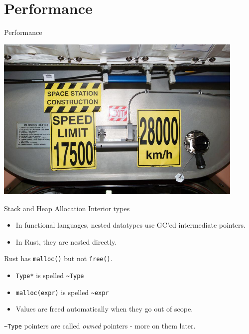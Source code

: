 \documentclass[xcolor=dvipsnames]{beamer}
\begin{document}
\section{Performance}

\begin{frame}{Performance}
	\begin{center}
	\includegraphics[width=0.9\textwidth]{speed.jpg}
	\end{center}
\end{frame}

\begin{frame}{Stack and Heap Allocation}
	Interior types
	\begin{itemize}
		\item In functional languages, nested datatypes use GC'ed intermediate pointers.
		\item In Rust, they are nested directly.
	\end{itemize}
	\pause
	\linegap

	Rust has \texttt{malloc()} but not \texttt{free()}.
	\begin{itemize}
		\item \texttt{Type*} is spelled \texttt{\textasciitilde{}Type}
		\item \texttt{malloc(expr)} is spelled \texttt{\textasciitilde{}expr}
		\item Values are freed automatically when they go out of scope.
	\end{itemize}
	\pause
	\linegap
	\texttt{\textasciitilde{}Type} pointers are called {\em owned} pointers - more on them later.
\end{frame}
\end{document}
